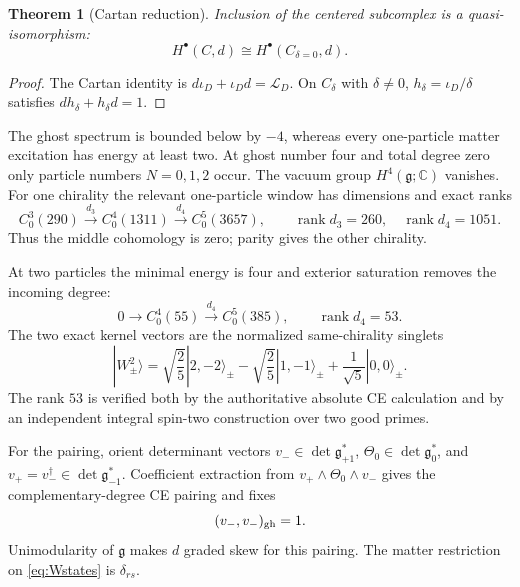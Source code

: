\documentclass[11pt]{article}
\newtheorem{theorem}{Theorem}[section]
\theoremstyle{remark}
\newcommand{\C}{\mathbb C}
\newcommand{\g}{\mathfrak g}
\newcommand{\rank}{\operatorname{rank}}
\begin{document}
\begin{theorem}[Cartan reduction]\label{thm:cartan-a}
Inclusion of the centered subcomplex is a quasi-isomorphism:
\begin{equation}\label{eq:cartan-a}
 H^\bullet(C,d)\cong H^\bullet(C_{\delta=0},d).
\end{equation}
\end{theorem}

\begin{proof}
The Cartan identity is
$d\iota_D+\iota_Dd=\mathcal L_D$.  On $C_\delta$ with $\delta\ne0$,
$h_\delta=\iota_D/\delta$ satisfies $dh_\delta+h_\delta d=1$.
\end{proof}

The ghost spectrum is bounded below by $-4$, whereas every one-particle
matter excitation has energy at least two.  At ghost number four and total
degree zero only particle numbers $N=0,1,2$ occur.  The vacuum group
$H^4(\g;\C)$ vanishes.  For one chirality the relevant one-particle window
has dimensions and exact ranks
\begin{equation}\label{eq:one-ranks}
 C^3_0(290)\xrightarrow{d_3}C^4_0(1311)
 \xrightarrow{d_4}C^5_0(3657),
 \qquad \rank d_3=260,
 \quad \rank d_4=1051.
\end{equation}
Thus the middle cohomology is zero; parity gives the other chirality.

At two particles the minimal energy is four and exterior saturation removes
the incoming degree:
\begin{equation}\label{eq:two-ranks}
 0\longrightarrow C^4_0(55)\xrightarrow{d_4}C^5_0(385),
 \qquad \rank d_4=53.
\end{equation}
The two exact kernel vectors are the normalized same-chirality singlets
\begin{equation}\label{eq:Wstates}
 |W_\pm^2\rangle
 =\sqrt{\frac25}|2,-2\rangle_\pm
 -\sqrt{\frac25}|1,-1\rangle_\pm
 +\frac1{\sqrt5}|0,0\rangle_\pm.
\end{equation}
The rank $53$ is verified both by the authoritative absolute CE calculation
and by an independent integral spin-two construction over two good primes.

For the pairing, orient determinant vectors
$v_-\in\det\g_{+1}^*$, $\Theta_0\in\det\g_0^*$, and
$v_+=v_-^\dagger\in\det\g_{-1}^*$.  Coefficient extraction from
$v_+\wedge\Theta_0\wedge v_-$ gives the complementary-degree CE pairing and
fixes
\begin{equation}\label{eq:ghostnorm-a}
 (v_-,v_-)_{\rm gh}=1.
\end{equation}
Unimodularity of $\g$ makes $d$ graded skew for this pairing.  The matter
restriction on \eqref{eq:Wstates} is $\delta_{rs}$.
\end{document}
